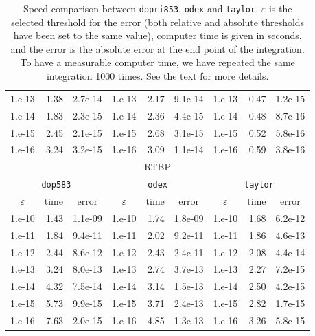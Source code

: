 \documentclass[12pt,twoside]{article}
\begin{document}
\begin{table}
\begin{center}
{\begin{tabular}{|r|r|r||r|r|r||r|r|r|}
1.e-13 & 1.38 & 2.7e-14 & 1.e-13 & 2.17 & 9.1e-14 & 1.e-13 & 0.47 & 1.2e-15\\
1.e-14 & 1.83 & 2.3e-15 & 1.e-14 & 2.36 & 4.4e-15 & 1.e-14 & 0.48 & 8.7e-16\\
1.e-15 & 2.45 & 2.1e-15 & 1.e-15 & 2.68 & 3.1e-15 & 1.e-15 & 0.52 & 5.8e-16\\
1.e-16 & 3.24 & 3.2e-15 & 1.e-16 & 3.09 & 1.1e-14 & 1.e-16 & 0.59 & 3.8e-16\\
\hline\hline
\multicolumn{9}{|c|}{\textrm{RTBP}} \\ \hline
\multicolumn{3}{|c||}{\texttt{dop583}} &
\multicolumn{3}{c||}{\texttt{odex}} &
\multicolumn{3}{c|}{\texttt{taylor}} \\ \hline
\multicolumn{1}{|c|}{$\varepsilon$} &
\multicolumn{1}{|c|}{\textrm{time}} &
\multicolumn{1}{|c||}{\textrm{error}} &
\multicolumn{1}{|c|}{$\varepsilon$} &
\multicolumn{1}{|c|}{\textrm{time}} &
\multicolumn{1}{|c||}{\textrm{error}} &
\multicolumn{1}{|c|}{$\varepsilon$} &
\multicolumn{1}{|c|}{\textrm{time}} &
\multicolumn{1}{|c|}{\textrm{error}}\\ \hline
1.e-10 & 1.43 & 1.1e-09 & 1.e-10 & 1.74 & 1.8e-09 & 1.e-10 & 1.68 & 6.2e-12\\
1.e-11 & 1.84 & 9.4e-11 & 1.e-11 & 2.02 & 9.2e-11 & 1.e-11 & 1.86 & 4.6e-13\\
1.e-12 & 2.44 & 8.6e-12 & 1.e-12 & 2.43 & 2.4e-11 & 1.e-12 & 2.08 & 4.4e-14\\
1.e-13 & 3.24 & 8.0e-13 & 1.e-13 & 2.74 & 3.7e-13 & 1.e-13 & 2.27 & 7.2e-15\\
1.e-14 & 4.32 & 7.5e-14 & 1.e-14 & 3.14 & 1.5e-13 & 1.e-14 & 2.50 & 4.2e-15\\
1.e-15 & 5.73 & 9.9e-15 & 1.e-15 & 3.71 & 2.4e-13 & 1.e-15 & 2.82 & 1.7e-15\\
1.e-16 & 7.63 & 2.0e-15 & 1.e-16 & 4.85 & 1.3e-13 & 1.e-16 & 3.26 & 5.8e-15\\
\hline
\end{tabular}
}
\end{center}
\caption{Speed comparison between \texttt{dopri853}, \texttt{odex} and
\texttt{taylor}. $\varepsilon$ is the selected threshold for the error
(both relative and absolute thresholds have been set to the same
value), computer time is given in seconds, and the error is the
absolute error at the end point of the integration. To have a
measurable computer time, we have repeated the same integration 1000
times. See the text for more details.}
\label{tau:speed}
\end{table}
\end{document}
